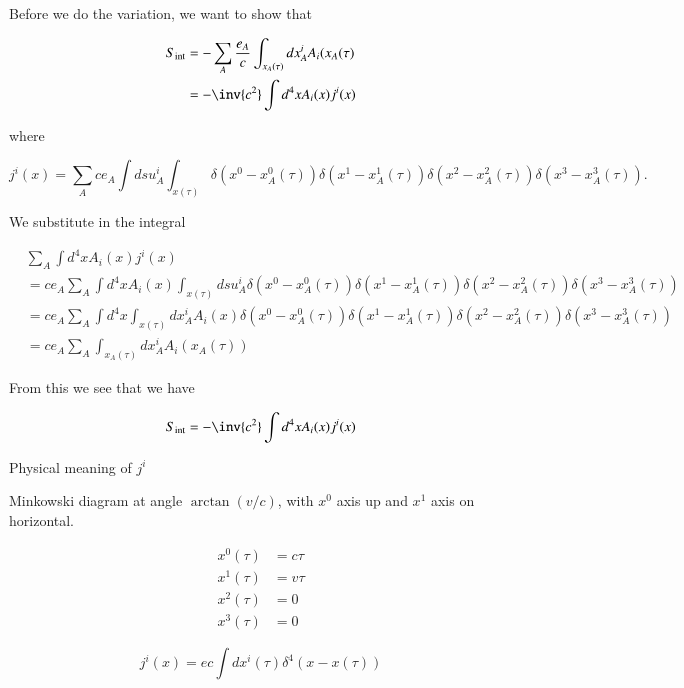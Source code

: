 Before we do the variation, we want to show that

\begin{align*}
S_{\text{int}} 
&= -\sum_A \frac{e_A}{c} \int_{x_A(\tau)} dx^i_A A_i(x_A(\tau) \\
&= -\inv{c^2} \int d^4 x A_i(x) j^i(x) 
\end{align*}

where

\begin{equation}\label{eqn:relativisticElectrodynamicsL12:390}
j^i(x) = 
\sum_A c e_A \int ds u^i_A 
\int_{x(\tau)}
\delta(x^0 - x^0_A(\tau))
\delta(x^1 - x^1_A(\tau))
\delta(x^2 - x^2_A(\tau))
\delta(x^3 - x^3_A(\tau)).
\end{equation}

We substitute in the integral

\begin{align*}
&\sum_A \int d^4 x A_i(x) j^i(x) \\
&= 
c e_A \sum_A \int d^4 x A_i(x) 
\int_{x(\tau)}
ds u^i_A 
\delta(x^0 - x^0_A(\tau))
\delta(x^1 - x^1_A(\tau))
\delta(x^2 - x^2_A(\tau))
\delta(x^3 - x^3_A(\tau)) \\
&= 
c e_A \sum_A 
\int d^4 x 
\int_{x(\tau)}
dx^i_A 
A_i(x) 
\delta(x^0 - x^0_A(\tau))
\delta(x^1 - x^1_A(\tau))
\delta(x^2 - x^2_A(\tau))
\delta(x^3 - x^3_A(\tau)) \\
&=
c e_A \sum_A 
\int_{x_A(\tau)}
dx^i_A 
A_i(x_A(\tau)) 
\end{align*}

From this we see that we have

\begin{equation}\label{eqn:relativisticElectrodynamicsL12:430}
S_{\text{int}} = -\inv{c^2} \int d^4 x A_i(x) j^i(x) 
\end{equation}

Physical meaning of $j^i$

Minkowski diagram at angle $\arctan(v/c)$, with $x^0$ axis up and $x^1$ axis on horizontal.

\begin{align}\label{eqn:relativisticElectrodynamicsL12:450}
x^0(\tau) &= c \tau \\
x^1(\tau) &= v \tau \\
x^2(\tau) &= 0 \\
x^3(\tau) &= 0
\end{align}

\begin{equation}\label{eqn:relativisticElectrodynamicsL12:470}
j^i(x) = e c \int dx^i(\tau) \delta^4 (x - x(\tau))
\end{equation}


